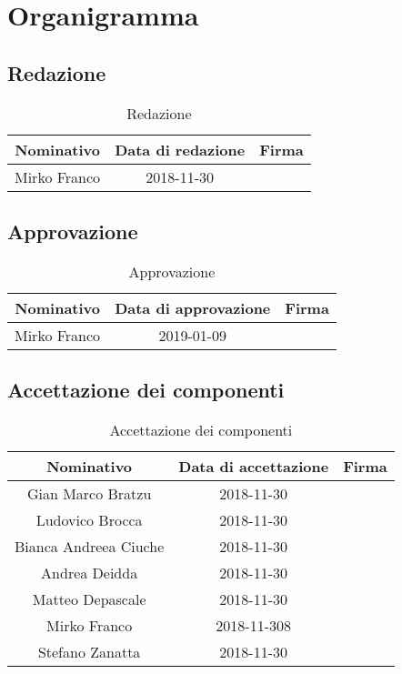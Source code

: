 \chapter{Organigramma}
\section{Redazione}
	\begin{table}[htp]
		\centering
		\caption{Redazione}
			\begin{tabular}{|c|c|c|}
				\hline
				\textbf{Nominativo} & \textbf{Data di redazione} & \textbf{Firma} \\
				\hline 
				Mirko Franco & 2018-11-30 &  \\
				\hline
			\end{tabular}
	\end{table}
\section{Approvazione}
\begin{table}[htp]
	\centering
	\caption{Approvazione}
	\begin{tabular}{|c|c|c|}
		\hline
		\textbf{Nominativo} & \textbf{Data di approvazione} & \textbf{Firma} \\
		\hline 
		Mirko Franco & 2019-01-09 &  \\
		\hline
	\end{tabular}
\end{table}
\clearpage
\section{Accettazione dei componenti}

	\begin{table}[htp]
		\centering
		\caption{Accettazione dei componenti}
		\begin{tabular}{|c|c|c|}
			\hline
			\textbf{Nominativo} & \textbf{Data di accettazione} & \textbf{Firma} \\
			\hline 
			Gian Marco Bratzu & 2018-11-30 & \\
			Ludovico Brocca & 2018-11-30 & \\
			Bianca  Andreea Ciuche & 2018-11-30 & \\
			Andrea Deidda & 2018-11-30 & \\
			Matteo Depascale & 2018-11-30 & \\
	 		Mirko Franco & 2018-11-308 &  \\
	 		Stefano Zanatta & 2018-11-30 & \\
			\hline
		\end{tabular}
	\end{table}


